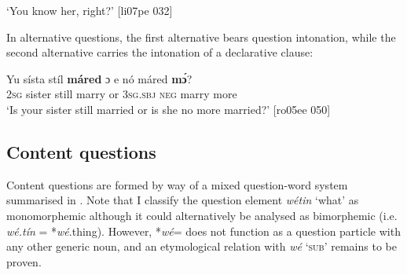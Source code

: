 \glt ‘You know her, right?’ [li07pe 032]
\z

In alternative questions, the first alternative bears question intonation, while the second alternative carries the intonation of a declarative clause: 


\ea%
    \label{ex:key:584}
\gll
Yu  sísta    stíl  \textbf{máred}  ɔ  e    nó  máred  \textbf{mɔ́}?\\
\textsc{2sg}  sister  still  marry  or  \textsc{3sg.sbj}  \textsc{neg}  marry  more\\

\glt ‘Is your sister still married or is she no more married?’ [ro05ee 050]
\z

\subsection{Content questions}\label{sec:7.3.2}

Content questions are formed by way of a mixed question-word system summarised in . Note that I classify the question element \textit{wétin} ‘what’ as monomorphemic although it could alternatively be analysed as bimorphemic (i.e. \textit{wé.tín} = *\textit{wé}.thing). However, *\textit{wé}= does not function as a question particle with any other generic noun, and an etymological relation with \textit{wé} ‘\textsc{sub}’ remains to be proven.


